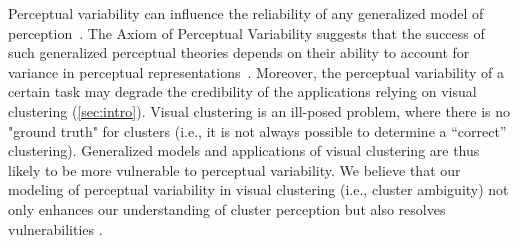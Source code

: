 Perceptual variability can influence the reliability of any generalized model of perception~\cite{zaman21pbr}. 
The Axiom of Perceptual Variability
suggests that the success of such generalized perceptual theories depends on their ability to account for variance in perceptual representations~\cite{ashby1993perceptual}. 
Moreover, the perceptual variability of a certain task may degrade the credibility of the applications relying on visual clustering (\autoref{sec:intro}).
Visual clustering is an ill-posed problem, where 
there is no "ground truth" for clusters 
 (i.e., it is not always possible to determine a ``correct'' clustering). 
Generalized models and applications of visual clustering are thus likely to be more vulnerable to perceptual variability. We believe that our modeling of perceptual variability in visual clustering (i.e., cluster ambiguity) not only enhances our understanding of cluster perception but also resolves  vulnerabilities . 







% 

